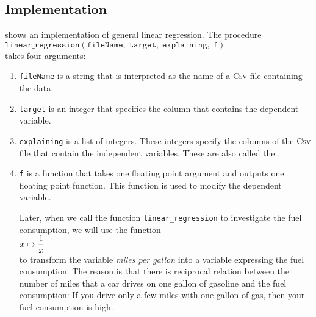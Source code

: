 \subsection{Implementation}
 shows an implementation of general linear regression.
The procedure
\\[0.2cm]
\hspace*{1.3cm}
$\mathtt{linear\_regression}(\mathtt{fileName},\; \mathtt{target},\; \mathtt{explaining},\; \mathtt{f})$
\\[0.2cm]
takes four arguments:
\begin{enumerate}
\item \texttt{fileName} is a string that is interpreted as the name of a \textsc{Csv} file containing the data.
\item \texttt{target} is an integer that specifies the column that contains the dependent variable. 
\item \texttt{explaining} is a list of integers.  These integers specify the columns of the \textsc{Csv} file
      that contain the independent variables.  These are also called the .
\item \texttt{f} is a function that takes one floating point argument and outputs one floating point function.
      This function is used to modify the dependent variable.

      Later, when we call the function \texttt{linear\_regression} to investigate the fuel consumption, we will
      use the function
      \\[0.2cm]
      \hspace*{1.3cm}
      $\displaystyle x \mapsto \frac{1}{x}$
      \\[0.2cm]
      to transform the variable \textsl{miles per gallon} into a variable expressing the fuel consumption.  The
      reason is that there is reciprocal relation between the number of miles that a car drives on one gallon
      of gasoline and the fuel consumption:  If you drive only a few miles with one gallon of gas, then your
      fuel consumption is high.
\end{enumerate}

